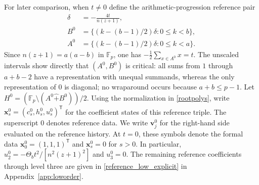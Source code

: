 \documentclass[10pt,a4paper]{amsart}
\newcommand{\F}{\mathbb{F}_p}
\newcommand{\rs}{\mathbin{\widehat+}}
\begin{document}
For later comparison, when $t\ne0$ define the arithmetic-progression
reference pair
\begin{equation}\label{referenceprogressions}
\begin{aligned}
 \delta&=-\frac{4t}{n(z+1)},\\
 B^0&=\{(k-(b-1)/2)\delta:0\le k<b\},\\
 A^0&=\{(k-(b-1)/2)\delta:0\le k<a\}.
\end{aligned}
\end{equation}
Since $n(z+1)=a(a-b)$ in $\F$, one has
$-\tfrac12\sum_{x\in A^0}x=t$.  The unscaled intervals show directly that
$(A^0,B^0)$ is critical: all sums from $1$ through $a+b-2$ have a
representation with unequal summands, whereas the only representation of $0$ is diagonal; no wraparound
occurs because $a+b\le p-1$.  Let
$H^0=(\F\setminus(A^0\rs B^0))/2$.  Using the normalization in
\eqref{rootpolys}, write
$\mathbf x_s^0=(c_s^0,h_s^0,u_s^0)^{\mathsf T}$ for the coefficient
states of this reference triple.  The superscript $0$ denotes reference
data.  We write $\mathbf v_j^0$ for the right-hand side evaluated on
the reference history.  At $t=0$, these symbols denote the formal data
$\mathbf x_0^0=(1,1,1)^{\mathsf T}$ and $\mathbf x_s^0=0$ for $s>0$.
In particular, $u_2^0=-\Theta_bt^2/[n^2(z+1)^2]$ and $u_3^0=0$.
The remaining reference coefficients through level three are given
in \eqref{reference_low_explicit} in Appendix~\ref{app:loworder}.
\end{document}
